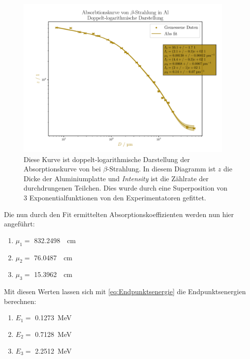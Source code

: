 \documentclass[12pt,english,ngerman]{scrartcl}
\begin{document}
\begin{figure}[H]
	\begin{center}
		\includegraphics[width=0.95\textwidth]{figures/absorption2log3er.pdf}
	\end{center}
	\caption[Doppelt-logarithmische Darstellung der Absorptionskurve von  bei
		$\beta$-Strahlung (3er Superposition Experimentatoren)]{
		Diese Kurve ist
		doppelt-logarithmische Darstellung der Absorptionskurve von  bei
		$\beta$-Strahlung. In diesem Diagramm ist $z$ die Dicke der Aluminiumplatte und
		\emph{Intensity} ist die Zählrate der durchdrungenen Teilchen. Dies wurde durch
		eine Superposition von 3 Exponentialfunktionen von den Experimentatoren
		gefittet.
	}\label{fig:3er_alu_abs_doppel}
\end{figure}
Die nun durch den Fit ermittelten Absorptionskoeffizienten werden nun hier
angeführt:

\begin{enumerate}
	\item $\mu_1 = $ \SI{832.2498}{\per\cm}
	\item $\mu_2 = $ \SI{76.0487}{\per\cm}
	\item $\mu_3 = $ \SI{15.3962}{\per\cm}
\end{enumerate}

Mit diesen Werten lassen sich mit \autoref{eq:Endpunktsenergie} die
Endpunktsenergien berechnen:

\begin{enumerate}
	\item $E_1 = $ \SI{0.1273}{\mega\electronvolt}
	\item $E_2 = $ \SI{0.7128}{\mega\electronvolt}
	\item $E_3 = $ \SI{2.2512}{\mega\electronvolt}
\end{enumerate}
\end{document}
